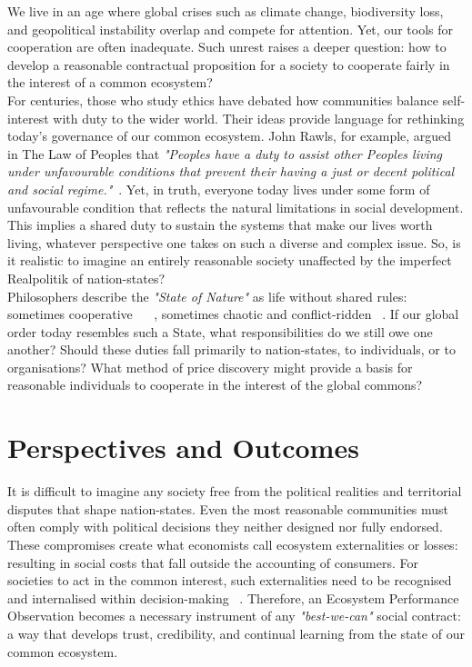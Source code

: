 \documentclass[10pt, oneside]{article}   	%
\begin{document}
We live in an age where global crises such as climate change, biodiversity loss, and geopolitical instability overlap and compete for attention.
Yet, our tools for cooperation are often inadequate.
Such unrest raises a deeper question: how to develop a reasonable contractual proposition for a society to cooperate fairly in the interest of a common ecosystem?\\

For centuries, those who study ethics have debated how communities balance self-interest with duty to the wider world.
Their ideas provide language for rethinking today’s governance of our common ecosystem.
John Rawls, for example, argued in The Law of Peoples that \emph{"Peoples have a duty to assist other Peoples living under unfavourable conditions that prevent their having a just or decent political and social regime."}~\cite{jr2}.
Yet, in truth, everyone today lives under some form of unfavourable condition that reflects the natural limitations in social development.
This implies a shared duty to sustain the systems that make our lives worth living, whatever perspective one takes on such a diverse and complex issue.
So, is it realistic to imagine an entirely reasonable society unaffected by the imperfect Realpolitik of nation-states?\\

Philosophers describe the \emph{"State of Nature"} as life without shared rules: sometimes cooperative ~\cite{jl1} ~\cite{rn1}, sometimes chaotic and conflict-ridden ~\cite{th1}.
If our global order today resembles such a State, what responsibilities do we still owe one another?
Should these duties fall primarily to nation-states, to individuals, or to organisations?
What method of price discovery might provide a basis for reasonable individuals to cooperate in the interest of the global commons?

\section{Perspectives and Outcomes}

It is difficult to imagine any society free from the political realities and territorial disputes that shape nation-states.
Even the most reasonable communities must often comply with political decisions they neither designed nor fully endorsed.
These compromises create what economists call ecosystem externalities or losses: resulting in social costs that fall outside the accounting of consumers.
For societies to act in the common interest, such externalities need to be recognised and internalised within decision-making ~\cite{rc1}.
Therefore, an Ecosystem Performance Observation becomes a necessary instrument of any \emph{"best-we-can"} social contract: a way that develops trust, credibility, and continual learning from the state of our common ecosystem.\\
\end{document}
